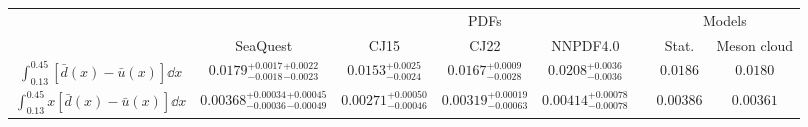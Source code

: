 \renewcommand{\arraystretch}{1.5}
\begin{tabular}{cccccccc}
\hline \hline
 &          & \multicolumn{3}{c}{PDFs} & & \multicolumn{2}{c}{Models} \\ \cline{3-5} \cline{7-8}
 & SeaQuest & CJ15 &CJ22     & NNPDF4.0     & & Stat.     & Meson cloud    \\ \hline
$\int^{0.45}_{0.13} \left[\bar{d}\left(x\right) - \bar{u}\left(x\right) \right]\dd{x}$ &
  $0.0179_{-0.0018}^{+0.0017} {}_{-0.0023}^{+0.0022}$ &
  $0.0153^{+0.0025}_{-0.0024}$ &
  $0.0167^{+0.0009}_{-0.0028}$ &
  $0.0208^{+0.0036}_{-0.0036}$ & &
  $0.0186$ &
  $0.0180$ \\
$\int^{0.45}_{0.13} x\left[\bar{d}\left(x\right) - \bar{u}\left(x\right) \right]\dd{x}$ &
  $0.00368_{-0.00036}^{+0.00034} {}_{-0.00049}^{+0.00045}$ &
  $0.00271^{+0.00050}_{-0.00046}$ &
  $0.00319^{+0.00019}_{-0.00063}$ &
  $0.00414^{+0.00078}_{-0.00078}$ & &
  $0.00386$ &
  $0.00361$ \\ \hline \hline
\end{tabular}
